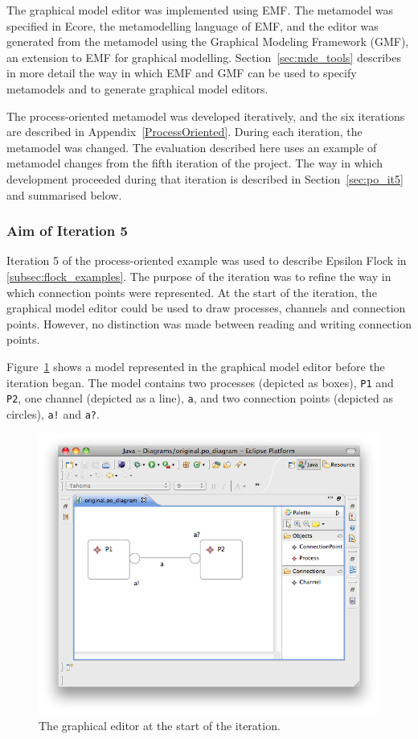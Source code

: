 The graphical model editor was implemented using EMF. The metamodel was specified in Ecore, the metamodelling language of EMF, and the editor was generated from the metamodel using the Graphical Modeling Framework (GMF), an extension to EMF for graphical modelling. Section~\ref{sec:mde_tools} describes in more detail the way in which EMF and GMF can be used to specify metamodels and to generate graphical model editors.

The process-oriented metamodel was developed iteratively, and the six iterations are described in Appendix~\ref{ProcessOriented}. During each iteration, the metamodel was changed. The evaluation described here uses an example of metamodel changes from the fifth iteration of the project. The way in which development proceeded during that iteration is described in Section~\ref{sec:po_it5} and summarised below.

\subsubsection{Aim of Iteration 5}
Iteration 5 of the process-oriented example was used to describe Epsilon Flock in \ref{subsec:flock_examples}. The purpose of the iteration was to refine the way in which connection points were represented. At the start of the iteration, the graphical model editor could be used to draw processes, channels and connection points. However, no distinction was made between reading and writing connection points.

Figure~\ref{fig:po_original_editor} shows a model represented in the graphical model editor before the iteration began. The model contains two processes (depicted as boxes), \texttt{P1} and \texttt{P2}, one channel (depicted as a line), \texttt{a}, and two connection points (depicted as circles), \texttt{a!} and \texttt{a?}.

\begin{figure}[htbp]
	\centering
	\includegraphics[width=13.5cm]{6.Evaluation/images/user_driven/po_original_editor.png}
	\caption{The graphical editor at the start of the iteration.}
	\label{fig:po_original_editor}
\end{figure}


